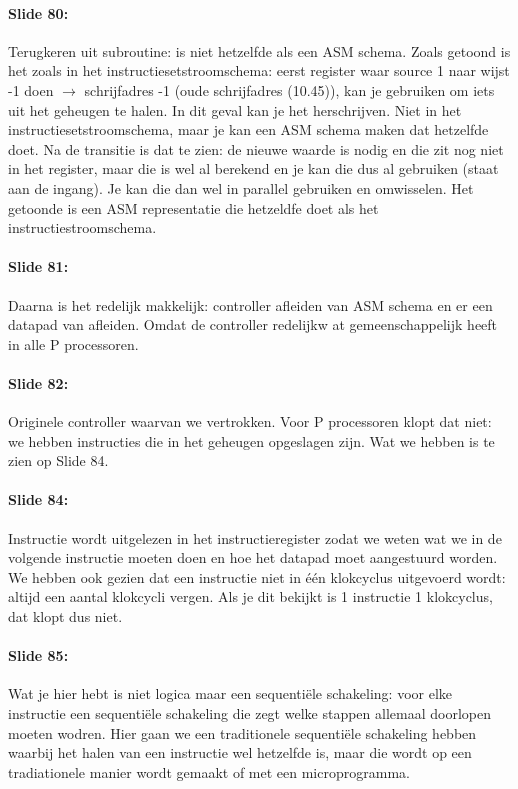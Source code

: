 \documentclass[10pt,a4paper]{book}
\begin{document}
\paragraph{Slide 80:} Terugkeren uit subroutine: is niet hetzelfde als een ASM schema. Zoals getoond is het zoals in het instructiesetstroomschema: eerst register waar source 1 naar wijst -1 doen $\rightarrow$ schrijfadres -1 (oude schrijfadres (10.45)), kan je gebruiken om iets uit het geheugen te halen. In dit geval kan je het herschrijven. Niet in het instructiesetstroomschema, maar je kan een ASM schema maken dat hetzelfde doet. Na de transitie is dat te zien: de nieuwe waarde is nodig en die zit nog niet in het register, maar die is wel al berekend en je kan die dus al gebruiken (staat aan de ingang). Je kan die dan wel in parallel gebruiken en omwisselen. Het getoonde is een ASM representatie die hetzeldfe doet als het instructiestroomschema.

\paragraph{Slide 81:} Daarna is het redelijk makkelijk: controller afleiden van ASM schema en er een datapad van afleiden. Omdat de controller redelijkw at gemeenschappelijk heeft in alle P processoren.

\paragraph{Slide 82:} Originele controller waarvan we vertrokken. Voor P processoren klopt dat niet: we hebben instructies die in het geheugen opgeslagen zijn. Wat we hebben is te zien op Slide 84.

\paragraph{Slide 84:} Instructie wordt uitgelezen in het instructieregister zodat we weten wat we in de volgende instructie moeten doen en hoe het datapad moet aangestuurd worden. We hebben ook gezien dat een instructie niet in \'e\'en klokcyclus uitgevoerd wordt: altijd een aantal klokcycli vergen. Als je dit bekijkt is 1 instructie 1 klokcyclus, dat klopt dus niet. 

\paragraph{Slide 85:} Wat je hier hebt is niet logica maar een sequenti\"ele schakeling: voor elke instructie een sequenti\"ele schakeling die zegt welke stappen allemaal doorlopen moeten wodren. Hier gaan we een traditionele sequenti\"ele schakeling hebben waarbij het halen van een instructie wel hetzelfde is, maar die wordt op een tradiationele manier wordt gemaakt of met een microprogramma.
\end{document}
